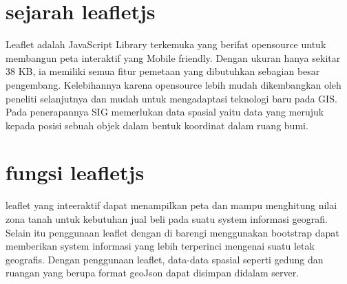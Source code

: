  
 
 
 \section{sejarah leafletjs}
        Leaflet adalah JavaScript Library terkemuka yang berifat opensource untuk membangun peta interaktif yang Mobile friendly. Dengan ukuran hanya sekitar 38 KB, ia memiliki semua fitur pemetaan yang dibutuhkan sebagian besar pengembang.
    Kelebihannya karena opensource lebih mudah dikembangkan oleh peneliti selanjutnya dan mudah untuk mengadaptasi teknologi baru pada GIS. Pada penerapannya SIG memerlukan data spasial yaitu data yang merujuk kepada posisi sebuah objek dalam bentuk koordinat dalam ruang bumi.
   \section{fungsi leafletjs}
   leaflet yang inteeraktif  dapat menampilkan peta dan mampu menghitung nilai zona tanah untuk kebutuhan jual beli pada suatu system informasi geografi. Selain itu penggunaan leaflet dengan di barengi menggunakan bootstrap dapat memberikan system informasi yang lebih terperinci mengenai suatu letak geografis. Dengan penggunaan leaflet, data-data spasial seperti gedung dan ruangan yang berupa format geoJson dapat disimpan didalam server.

